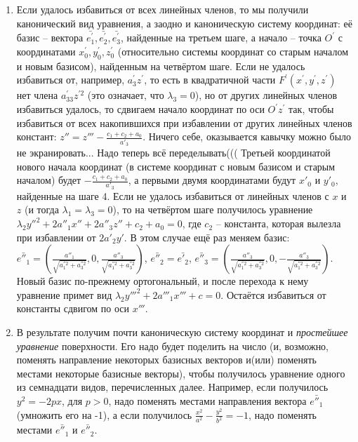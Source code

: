 \documentclass[a4paper, 12pt]{article}
\theoremstyle{definition}
\begin{document}
\begin{enumerate}
    \item Если удалось избавиться от всех линейных членов, то мы получили канонический вид уравнения, а заодно и каноническую систему координат: её базис – вектора $\bar{e_1^{'}}, \bar{e_2^{'}}, \bar{e_3^{'}}$, найденные на третьем шаге, а начало – точка $O^{'}$ с координатами $x_0^{'}, y_0^{'}, z_0^{'}$ (относительно системы координат со старым началом и новым базисом), найденным на четвёртом шаге.
    Если не удалось избавиться от, например, $a_3^{'} z^{'}$, то есть в квадратичной части $F^{'}(x^{'},y^{'},z^{'})$ нет члена $a_{33}^{'} z^{'2}$ (это означает, что $\lambda_3 = 0$), но от других линейных членов избавиться удалось, то сдвигаем начало координат по оси $O^{'} z^{'}$ так, чтобы избавиться от всех накопившихся при избавлении от других линейных членов констант:
    $z'' = z''' - \frac{c_1 + c_2 + a_0}{a'_3}$. Ничего себе, оказывается кавычку можно было не экранировать... Надо теперь всё переделывать(((
    Третьей координатой нового начала координат (в системе координат с новым базисом и старым началом) будет $- \frac{c_1 + c_2 + a_0}{a'_3}$, а первыми двумя координатами будут $x'_0$ и $y'_0$, найденные на шаге 4. Если не удалось избавиться от линейных членов с $x$ и $z$ (и тогда $\lambda_1 = \lambda_3 = 0$), то на четвёртом шаге получилось уравнение $\lambda_2 y''^2 + 2a''_1 x'' + 2a''_3 z'' + c_2 + a_0 = 0$, где $c_2$ – константа, которая вылезла при избавлении от $2a'_2 y'$.
    В этом случае ещё раз меняем базис:
    $\bar{e''_1} = \left( \frac{a''_1}{\sqrt{a_1^{''2} + a_3^{''2}}}, 0, \frac{a''_3}{\sqrt{a_1^{''2} + a_3^{''2}}} \right)$,
    $\bar{e''_2} = \bar{e'_2}$,
    $\bar{e''_3} = \left( \frac{a''_3}{\sqrt{a_1^{''2} + a_3^{''2}}}, 0, -\frac{a''_3}{\sqrt{a_1^{''2} + a_3^{''2}}} \right)$.
    Новый базис по-прежнему ортогональный, и после перехода к нему уравнение примет вид $\lambda_2 y'''^2 + 2a'''_1 x''' + c = 0$.
    Остаётся избавиться от константы сдвигом по оси $x'''$.
    \item В результате получим почти каноническую систему координат и \textit{простейшее уравнение} поверхности. Его надо будет поделить на число (и, возможно, поменять направление некоторых базисных векторов и(или) поменять местами некоторые базисные векторы), чтобы получилось уравнение одного из семнадцати видов, перечисленных далее.
    Например, если получилось $y^2 = -2px$, для $p > 0$, надо поменять местами направления вектора $\bar{e''_1}$ (умножить его на -1), а если получилось
    $\frac{x^2}{a^2} - \frac{y^2}{b^2} = -1$, надо поменять местами $\bar{e''_1}$ и $\bar{e''_2}$.
\end{enumerate}
\end{document}

